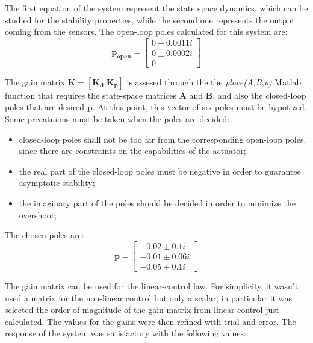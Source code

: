 The first equation of the system represent the state space dynamics, which can be studied for the stability properties, while the second one represents the output coming from the sensors. The open-loop poles calculated for this system are:
\begin{equation}
    \boldsymbol{p_{open}} =
    \begin{bmatrix}
        0 \pm 0.0011i \\   
        0 \pm 0.0002i \\   
        0
    \end{bmatrix}
\end{equation}

The gain matrix $\boldsymbol{K} = [\boldsymbol{K_d} \; \boldsymbol{K_p}]$ is assesed through the the \textit{place(A,B,p)} Matlab function that requires the state-space matrices $\boldsymbol{A}$ and $\boldsymbol{B}$, and also the closed-loop poles that are desired $\boldsymbol{p}$. At this point, this vector of six poles must be hypotized. Some precatuions must be taken when the poles are decided:
\begin{itemize}[wide,itemsep=3pt,topsep=3pt]
    \item closed-loop poles shall not be too far from the corresponding open-loop poles, since there are constraints on the capabilities of the actuator;
    \item the real part of the closed-loop poles must be negative in order to guarantee asymptotic stability;
    \item the imaginary part of the poles should be decided in order to minimize the overshoot;
\end{itemize}
The chosen poles are: 
\begin{equation}
    \boldsymbol{p} =
    \begin{bmatrix}
        -0.02 \pm 0.1i \\   
        -0.01 \pm 0.06i \\   
        -0.05 \pm 0.1i
    \end{bmatrix}
\end{equation}

The gain matrix can be used for the linear-control law. For simplicity, it wasn't used a matrix for the non-linear control but only a scalar, in particular it was selected the order of magnitude of the gain matrix from linear control just calculated.
The values for the gains were then refined with trial and error. The response of the system was satisfactory with the following values:

